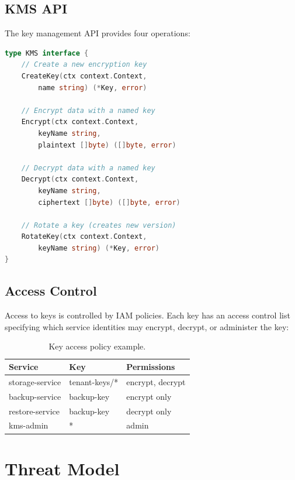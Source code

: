 \documentclass[11pt,a4paper]{article}
\begin{document}
\subsection{KMS API}

The key management API provides four operations:

\begin{lstlisting}[language=Go,caption=Key management interface.]
type KMS interface {
    // Create a new encryption key
    CreateKey(ctx context.Context,
        name string) (*Key, error)

    // Encrypt data with a named key
    Encrypt(ctx context.Context,
        keyName string,
        plaintext []byte) ([]byte, error)

    // Decrypt data with a named key
    Decrypt(ctx context.Context,
        keyName string,
        ciphertext []byte) ([]byte, error)

    // Rotate a key (creates new version)
    RotateKey(ctx context.Context,
        keyName string) (*Key, error)
}
\end{lstlisting}

\subsection{Access Control}

Access to keys is controlled by IAM policies. Each key has an access control list specifying which service identities may encrypt, decrypt, or administer the key:

\begin{table}[h]
\centering
\caption{Key access policy example.}
\begin{tabular}{lll}
\toprule
\textbf{Service} & \textbf{Key} & \textbf{Permissions} \\
\midrule
storage-service & tenant-keys/* & encrypt, decrypt \\
backup-service  & backup-key    & encrypt only \\
restore-service & backup-key    & decrypt only \\
kms-admin       & *             & admin \\
\bottomrule
\end{tabular}
\end{table}

\section{Threat Model}
\end{document}
